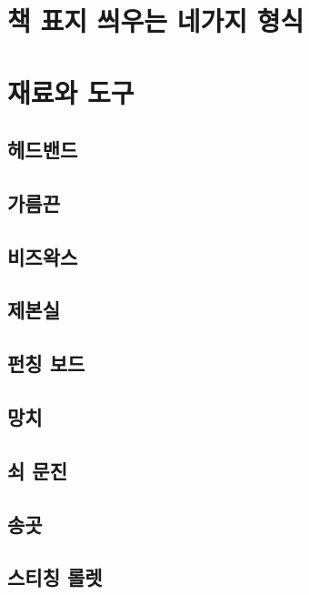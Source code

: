 \documentclass[12pt, a4paper, oneside]{book}
\begin{document}
	\chapter{책 표지 씌우는 네가지 형식}



	\newpage
	\chapter{재료와 도구}



	\section{헤드밴드}

	\section{가름끈}

	\section{비즈왁스}

	\section{제본실}


	\section{펀칭 보드}

	\section{망치}

	\section{쇠 문진}

	\section{송곳}

	\section{스티칭 롤렛}
\end{document}

